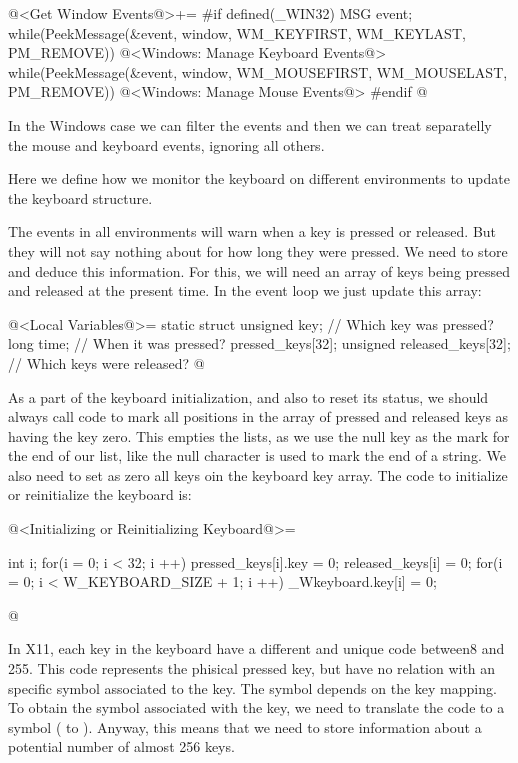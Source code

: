 \iniciocodigo
@<Get Window Events@>+=
#if defined(_WIN32)
MSG event;
while(PeekMessage(&event, window, WM_KEYFIRST, WM_KEYLAST, PM_REMOVE)){
  @<Windows: Manage Keyboard Events@>
}
while(PeekMessage(&event, window, WM_MOUSEFIRST, WM_MOUSELAST, PM_REMOVE)){
  @<Windows: Manage Mouse Events@>
}
#endif
@
\fimcodigo

In the Windows case we can filter the events and then we can treat
separatelly the mouse and keyboard events, ignoring all others.


Here we define how we monitor the keyboard on different environments
to update the keyboard structure.

The events in all environments will warn when a key is pressed or
released. But they will not say nothing about for how long they were
pressed. We need to store and deduce this information. For this, we
will need an array of keys being pressed and released at the present
time. In the event loop we just update this array:

\iniciocodigo
@<Local Variables@>=
static struct{
  unsigned key; // Which key was pressed?
  long time;    // When it was pressed?
} pressed_keys[32];
unsigned released_keys[32]; // Which keys were released?
@
\fimcodigo

As a part of the keyboard initialization, and also to reset its
status, we should always call code to mark all positions in the array
of pressed and released keys as having the key zero. This empties the
lists, as we use the null key as the mark for the end of our list,
like the null character is used to mark the end of a string. We also
need to set as zero all keys oin the keyboard key array. The code to
initialize or reinitialize the keyboard is:

\iniciocodigo
@<Initializing or Reinitializing Keyboard@>=
{
  int i;
  for(i = 0; i < 32; i ++){
    pressed_keys[i].key = 0;
    released_keys[i] = 0;
  }
  for(i = 0; i < W_KEYBOARD_SIZE + 1; i ++)
    _Wkeyboard.key[i] = 0;

}
@
\fimcodigo


In X11, each key in the keyboard have a different and unique code
between8 and 255. This code represents the phisical pressed key, but
have no relation with an specific symbol associated to the key. The
symbol depends on the key mapping. To obtain the symbol associated
with the key, we need to translate the code to a symbol
( to ). Anyway, this means that
we need to store information about a potential number of almost 256
keys.

